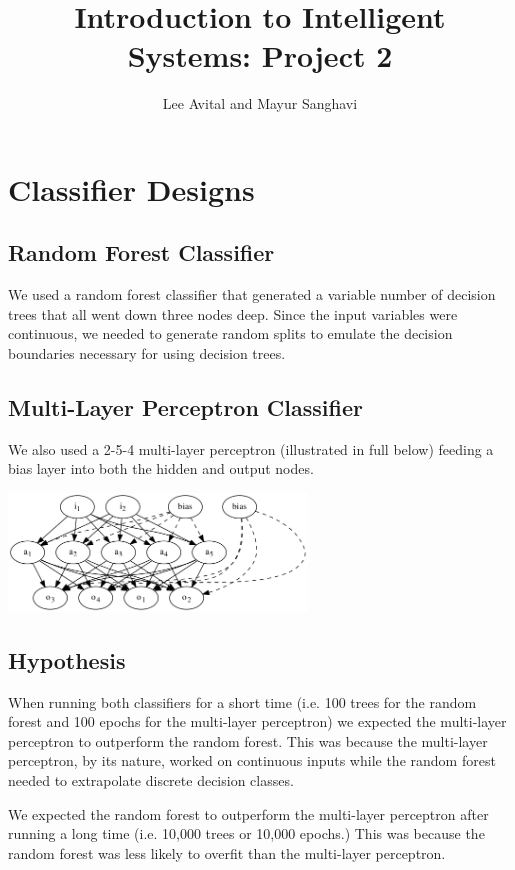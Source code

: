 \documentclass{article}
\title{Introduction to Intelligent Systems: Project 2}
\author{Lee Avital and Mayur Sanghavi}
\begin{document}
\maketitle


\section{Classifier Designs}

\subsection{Random Forest Classifier}

We used a random forest classifier that generated a variable number of decision trees that all went down three
nodes deep. Since the input variables were continuous, we needed to generate random splits to
emulate the decision boundaries necessary for using decision trees.

\subsection{Multi-Layer Perceptron Classifier}

We also used a 2-5-4 multi-layer perceptron (illustrated in full below) feeding a bias layer into
both the hidden and output nodes.

\includegraphics[width=300px]{1_net.png}

\subsection{Hypothesis}


When running both classifiers for a short time (i.e. 100 trees for the random forest and 100
epochs for the multi-layer perceptron) we expected the multi-layer perceptron to outperform the random forest.
This was because the multi-layer perceptron, by its nature, worked on continuous inputs while
the random forest needed to extrapolate discrete decision classes.

We expected the random forest to outperform the multi-layer perceptron after running a long
time (i.e. 10,000 trees or 10,000 epochs.) This was because the random forest was less likely to
overfit than the multi-layer perceptron.
\end{document}

